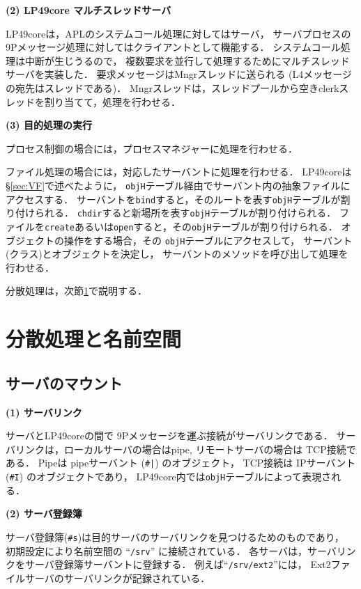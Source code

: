 \documentclass{ieicej}
\begin{document}
{\bf (2) LP49core マルチスレッドサーバ}

    LP49coreは，APLのシステムコール処理に対してはサーバ，
    サーバプロセスの9Pメッセージ処理に対してはクライアントとして機能する．
    システムコール処理は中断が生じうるので，
    複数要求を並行して処理するためにマルチスレッドサーバを実装した．
    要求メッセージはMngrスレッドに送られる
    (L4メッセージの宛先はスレッドである)．
    Mngrスレッドは，スレッドプールから空きclerkスレッドを割り当てて，処理を行わせる．

{\bf (3) 目的処理の実行}
  
    プロセス制御の場合には，プロセスマネジャーに処理を行わせる．

    ファイル処理の場合には，対応したサーバントに処理を行わせる．
    LP49coreは \S \ref{sec:VF}で述べたように，
    {\tt objH}テーブル経由でサーバント内の抽象ファイルにアクセスする．
    サーバントを{\tt bind}すると，そのルートを表す{\tt objH}テーブルが割り付けられる．
    {\tt chdir}すると新場所を表す{\tt objH}テーブルが割り付けられる．
    ファイルを{\tt create}あるいは{\tt open}すると，その{\tt objH}テーブルが割り付けられる．
    オブジェクトの操作をする場合，その {\tt objH}テーブルにアクセスして，
    サーバント(クラス)とオブジェクトを決定し，
    サーバントのメソッドを呼び出して処理を行わせる．

    分散処理は，次節\ref{sec:DP}で説明する．


\section{分散処理と名前空間}\label{sec:DP}

\subsection{サーバのマウント}

{\bf\flushleft (1) サーバリンク}

サーバとLP49coreの間で 9Pメッセージを運ぶ接続がサーバリンクである．
サーバリンクは，ローカルサーバの場合はpipe, 
リモートサーバの場合は TCP接続である．
%
Pipeは pipeサーバント (\verb$#|$) のオブジェクト，
TCP接続は IPサーバント (\verb|#I|) のオブジェクトであり，
LP49core内では{\tt objH}テーブルによって表現される．


{\bf\flushleft (2) サーバ登録簿}

  サーバ登録簿(\verb|#s|)は目的サーバのサーバリンクを見つけるためのものであり，
  初期設定により名前空間の ``{\tt /srv}'' に接続されている．
  各サーバは，サーバリンクをサーバ登録簿サーバントに登録する．
  例えば``{\tt /srv/ext2}''には， 
  Ext2ファイルサーバのサーバリンクが記録されている．
\end{document}
